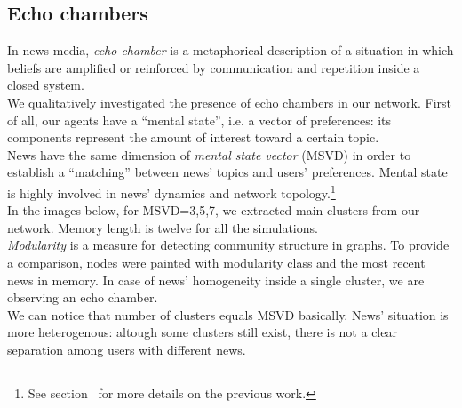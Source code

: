 \subsection{Echo chambers}
In news media, \textit{echo chamber} is a metaphorical description
of a situation in which beliefs are amplified or reinforced by
communication and repetition inside a closed system\cite{echochamwiki,echocham}.\\
We qualitatively investigated the presence of echo chambers in our network.
First of all, our agents have a ``mental  state'', i.e. a vector of preferences: its components represent the amount of interest toward a certain topic.\\
 News have the same dimension of \textit{mental state vector} (MSVD) in order to establish a ``matching'' between news' topics and users' preferences.
 Mental state is highly involved in news' dynamics and network topology.\footnote{See section~ for more details on the previous work.}\\
 In the images below, for MSVD=3,5,7, we extracted main clusters from our network.
 Memory length is twelve for all the simulations.\\
 \textit{Modularity} is a measure for detecting community structure in graphs\cite{modulwiki}.
 To provide a comparison, nodes were painted with modularity class and the most recent news in memory.
 In case of news' homogeneity inside a single cluster, we are observing an echo chamber.\\
We can notice that number of clusters equals MSVD basically.
News' situation is more heterogenous: altough some clusters still exist, there is not a clear separation among users with different news.


